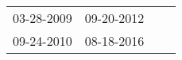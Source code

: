 \begin{supertabular}{llll}
 03-28-2009 &  09-20-2012 \\
 09-24-2010 &  08-18-2016 \\
\end{supertabular}

